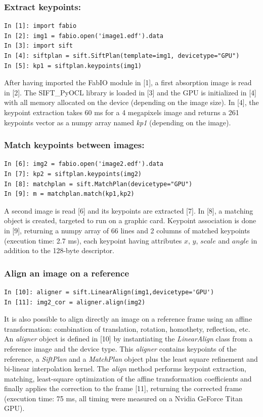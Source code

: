 \documentclass[preprint]{iucr}
\begin{document}
\subsubsection{Extract keypoints:}
\begin{verbatim}
In [1]: import fabio
In [2]: img1 = fabio.open('image1.edf').data
In [3]: import sift
In [4]: siftplan = sift.SiftPlan(template=img1, devicetype="GPU")
In [5]: kp1 = siftplan.keypoints(img1)
\end{verbatim}

After having imported the FabIO \cite{fabio} module in [1], a first
absorption image is read in [2]. The SIFT\_PyOCL library is loaded in [3] and the
GPU is initialized in [4] with all memory allocated on the device (depending on
the image size).
In [4], the keypoint extraction takes 60 ms for a
4 megapixels image and returns a 261 keypoints vector as a numpy array named
\emph{kp1} (depending on the image).

\subsubsection{Match keypoints between images:}
\begin{verbatim}
In [6]: img2 = fabio.open('image2.edf').data
In [7]: kp2 = siftplan.keypoints(img2)
In [8]: matchplan = sift.MatchPlan(devicetype="GPU")
In [9]: m = matchplan.match(kp1,kp2)
\end{verbatim}
A second image is read [6] and its keypoints are extracted [7].
In [8], a matching object is created, targeted to run on a graphic card.
Keypoint association is done in [9], returning a numpy array of 66 lines and 2
columns of matched keypoints (execution time: 2.7 ms), each keypoint having
attributes $x$, $y$, $scale$ and $angle$ in addition to the 128-byte descriptor.

\subsubsection{Align an image on a reference}
\begin{verbatim}
In [10]: aligner = sift.LinearAlign(img1,devicetype='GPU')
In [11]: img2_cor = aligner.align(img2)
\end{verbatim}
It is also possible to align directly an image on a reference frame using an
affine transformation: combination of translation, rotation, homothety,
reflection, etc.
An \emph{aligner} object is defined in [10] by instantiating the
\emph{LinearAlign} class from a reference image and the device type.
This \emph{aligner} contains keypoints of the
reference, a \emph{SiftPlan} and a \emph{MatchPlan} object plus the least square
refinement and bi-linear interpolation kernel.
The \emph{align} method performs keypoint extraction, matching, least-square
optimization of the affine transformation coefficients and finally applies the
correction to the frame [11], returning the corrected frame (execution time:
75 ms, all timing were measured on a Nvidia GeForce Titan GPU).
\end{document}
